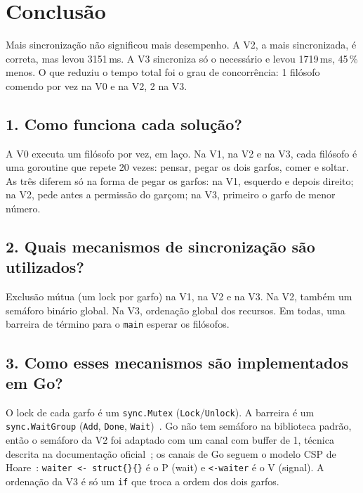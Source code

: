 \documentclass[11pt,a4paper]{article}
\begin{document}
\newpage
\section*{Conclusão}

Mais sincronização não significou mais desempenho. A V2, a mais sincronizada, é correta, mas
levou 3151\,ms. A V3 sincroniza só o necessário e levou 1719\,ms, 45\,\% menos. O que reduziu
o tempo total foi o grau de concorrência: 1 filósofo comendo por vez na V0 e na V2, 2 na V3.

\subsection*{1. Como funciona cada solução?}
A V0 executa um filósofo por vez, em laço. Na V1, na V2 e na V3, cada filósofo é uma goroutine
que repete 20 vezes: pensar, pegar os dois garfos, comer e soltar. As três diferem só na forma
de pegar os garfos: na V1, esquerdo e depois direito; na V2, pede antes a permissão do garçom;
na V3, primeiro o garfo de menor número.

\subsection*{2. Quais mecanismos de sincronização são utilizados?}
Exclusão mútua (um lock por garfo) na V1, na V2 e na V3. Na V2, também um semáforo binário
global. Na V3, ordenação global dos recursos. Em todas, uma barreira de término para o
\texttt{main} esperar os filósofos.

\subsection*{3. Como esses mecanismos são implementados em Go?}
O lock de cada garfo é um \texttt{sync.Mutex} (\texttt{Lock}/\texttt{Unlock}). A barreira é um
\texttt{sync.WaitGroup} (\texttt{Add}, \texttt{Done}, \texttt{Wait})~\cite{gosync,donovan2015,coxbuday2017}. Go não tem semáforo na
biblioteca padrão, então o semáforo da V2 foi adaptado com um canal com buffer de 1, técnica descrita
na documentação oficial~\cite{effectivego}; os canais de Go seguem o modelo CSP de Hoare~\cite{hoare1978}:
\texttt{waiter <- struct\{\}\{\}} é o P (wait) e \texttt{<-waiter} é o V (signal).
A ordenação da V3 é só um \texttt{if} que troca a ordem dos dois garfos.
\end{document}
